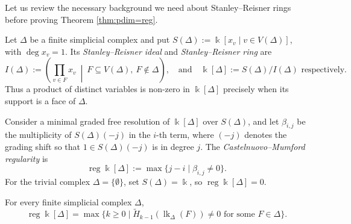 \documentclass[a4paper,leqno]{amsart}
\begin{document}
Let us review the necessary background we need about Stanley--Reisner rings before proving Theorem \ref{thm:pdim=reg}.

\begin{dfn}\label{def:SR ring}
Let $\Delta$ be a finite simplicial complex and put $S(\Delta):=\Bbbk[x_v\mid v\in V(\Delta)]$, with $\deg x_v=1$. Its \emph{Stanley--Reisner ideal} and \emph{Stanley--Reisner ring} are
\[
I(\Delta):=\left(\prod_{v\in F}x_v\ \middle|\ F\subseteq V(\Delta),\ F\notin \Delta\right), \quad \text{and}
\quad \Bbbk[\Delta]:=S(\Delta)/I(\Delta) \text{ respectively}.
\]
Thus a product of distinct variables is non-zero in $\Bbbk[\Delta]$ precisely when its support is a face of $\Delta$.

Consider a minimal graded free resolution of $\Bbbk[\Delta]$ over $S(\Delta)$, and let $\beta_{i,j}$ be the multiplicity of $S(\Delta)(-j)$ in the $i$-th term, where $(-j)$ denotes the grading shift so that $1\in S(\Delta)(-j)$ is in degree $j$. The \emph{Castelnuovo--Mumford regularity} is
\[
\operatorname{reg}\Bbbk[\Delta]:=\max\{j-i\mid\beta_{i,j}\neq0\}.
\]
For the trivial complex $\Delta=\{\emptyset\}$, set $S(\Delta)=\Bbbk$, so $\operatorname{reg}\Bbbk[\Delta]=0$.
\end{dfn}

\begin{lem}\label{lem:Hochshster easier}{\rm\cite{HH11}}
For every finite simplicial complex $\Delta$,
\[
\operatorname{reg}\Bbbk[\Delta]
=\max\{k\geq0\mid\widetilde H_{k-1}(\operatorname{lk}_\Delta(F))\neq0
\text{ for some }F\in \Delta\}.
\]
\end{lem}
\end{document}

